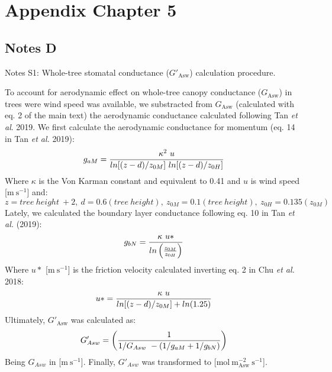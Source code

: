 \documentclass[11pt,twoside]{reedthesis}
\begin{document}
\chapter{Appendix Chapter 5}\label{appendix-chapter-5}

\newpage

\section{Notes D}\label{notes-d}

\normalsize

Notes S1: Whole-tree stomatal conductance (\(G'_{\text{Asw}}\))
calculation procedure.

To account for aerodynamic effect on whole-tree canopy conductance
(\(G_{\text{Asw}}\)) in trees were wind speed was available, we
substracted from \(G_{\text{Asw}}\) (calculated with eq. 2 of the main
text) the aerodynamic conductance calculated following Tan \emph{et al}.
2019. We first calculate the aerodynamic conductance for momentum (eq.
14 in Tan \emph{et al.} 2019):
\begin{equation}
g_{aM} = {{\kappa^{2}\ u} \over{ln[(z-d)/z_{0M}]\ ln[(z-d)/z_{0H}]}}
\end{equation}
Where \(\kappa\) is the Von Karman constant and equivalent to 0.41 and
\(u\) is wind speed {[}\(\text{m}\ \text{s}^{-1}\){]} and:
\begin{equation}
z = tree\ height\ + 2,\ d = 0.6(tree\ height),\ z_{0M}= 0.1(tree\ height),\ z_{0H}= 0.135(z_{0M})
\end{equation}
Lately, we calculated the boundary layer conductance following eq. 10 in
Tan \emph{et al.} (2019):
\begin{equation}
g_{bN} = {{\kappa\ u*} \over {ln\left({z_{0M}} \over {z_{0H}}\right)}}
\end{equation}
Where \(u*\) {[}\(\text{m}\ \text{s}^{-1}\){]} is the friction velocity
calculated inverting eq. 2 in Chu \emph{et al.} 2018:
\begin{equation}
u* = {\kappa \ u \over {ln[(z-d)/z_{0M}] + ln(1.25)}}
\end{equation}
Ultimately, \(G'_{\text{Asw}}\) was calculated as:
\begin{equation}
G'_{Asw}= \left({1 \over 1/G_{Asw} \ - (1/g_{aM} + 1/g_{bN})}\right)
\end{equation}
Being \(G_{Asw}\) in {[}\(\text{m} \ \text{s}^{-1}\){]}. Finally,
\(G'_{Asw}\) was transformed to
{[}\(\text{mol} \ \text{m}^{-2}_{\text{Asw}} \ \text{s}^{-1}\){]}.
\end{document}

